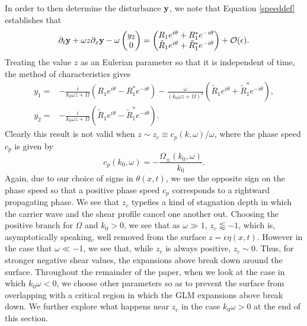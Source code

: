\documentclass{JFM_Style/jfm}
\newcommand{\bp}{\begin{pmatrix}}
\newcommand{\ep}{\end{pmatrix}}
\newcommand{\pd}{\partial}
\begin{document}
In order to then determine the disturbance ${\bf y}$, we note that Equation \eqref{speeddef} establishes that
\begin{equation}
\pd_{t}{\bf y} + \omega z \pd_{x}{\bf y} - \omega \bp y_{2}\\ 0 \ep = \bp R_{1}e^{i\theta}+R^{\ast}_{1}e^{-i\theta}\\ \tilde{R}_{1}e^{i\theta}+\tilde{R}^{\ast}_{1}e^{-i\theta} \ep + \mathcal{O}(\epsilon).
\label{vareqn}
\end{equation}
Treating the value $z$ as an Eulerian parameter so that it is independent of time, the method of characteristics gives 
\begin{align*}
y_{1} = & - \frac{i}{k_{0}\omega z + \Omega}\left(R_{1}e^{i\theta} -R^{\ast}_{1}e^{-i\theta} \right) - \frac{\omega}{(k_{0}\omega z + \Omega)^{2}}\left(\tilde{R}_{1}e^{i\theta} + \tilde{R}^{\ast}_{1}e^{-i\theta} \right),\\
y_{2} = & - \frac{i}{k_{0}\omega z + \Omega}\left(\tilde{R}_{1}e^{i\theta} -\tilde{R}^{\ast}_{1}e^{-i\theta} \right).
\end{align*}
Clearly this result is not valid when $z\sim z_{c} \equiv c_{p}(k,\omega)/\omega$, where the phase speed $c_{p}$ is given by 
\[
c_{p}(k_{0},\omega) = -\frac{\Omega_{\pm}(k_{0},\omega)}{k_{0}}.
\]
Again, due to our choice of signs in $\theta(x,t)$, we use the opposite sign on the phase speed so that a positive phase speed $c_{p}$ corresponds to a rightward propagating phase.   We see that $z_{c}$ typefies a kind of stagnation depth in which the carrier wave and the shear profile cancel one another out.  Choosing the positive branch for $\Omega$ and $k_{0}>0$, we see that as $\omega \gg 1$, $z_{c}\lessapprox -1$, which is, asymptotically speaking, well removed from the surface $z=\epsilon \eta(x,t)$.  However in the case that $\omega \ll -1$, we see that, while $z_{c}$ is always positive, $z_{c}\sim 0$.  Thus, for stronger negative shear values, the expansions above break down around the surface.    Throughout the remainder of the paper, when we look at the case in which $k_{0}\omega <0$, we choose other parameters so as to prevent the surface from overlapping with a critical region in which the GLM expansions above break down. We further explore what happens near $z_{c}$ in the case $k_{0}\omega >0$ at the end of this section.  
\end{document}
